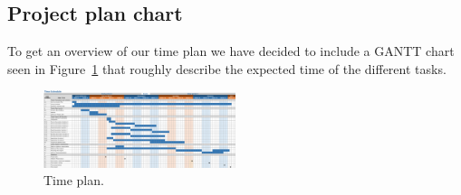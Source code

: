 \subsection{Project plan chart}
To get an overview of our time plan we have decided to include a GANTT chart seen in Figure~\ref{fig:time-plan} that roughly describe the expected time of the different tasks.

\newpage
\begin{figure}[H]
  \centering
  \vspace*{-1.0cm}
  \includegraphics[angle=90, width=0.5\textwidth]{figure/time-plan.png}
  \caption{Time plan.}
  \label{fig:time-plan}
\end{figure}

